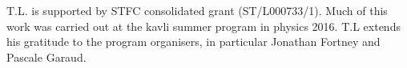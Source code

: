 \documentclass[a4paper,fleqn,usenatbib]{mnras}
\begin{document}
T.L. is supported by STFC consolidated grant (ST/L000733/1). Much of this work was carried out at the kavli summer program in physics 2016. T.L extends his gratitude to the program organisers, in particular Jonathan Fortney and Pascale Garaud.





%











\bsp	%
\label{lastpage}
\end{document}
